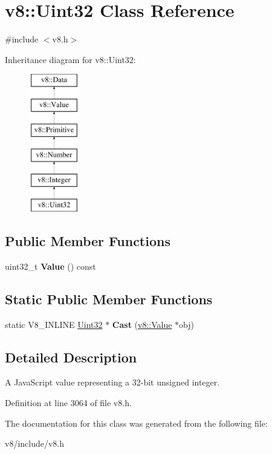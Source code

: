 \hypertarget{classv8_1_1Uint32}{}\section{v8\+:\+:Uint32 Class Reference}
\label{classv8_1_1Uint32}


{\ttfamily \#include $<$v8.\+h$>$}

Inheritance diagram for v8\+:\+:Uint32\+:\begin{figure}[H]
\begin{center}
\leavevmode
\includegraphics[height=6.000000cm]{classv8_1_1Uint32}
\end{center}
\end{figure}
\subsection*{Public Member Functions}
\begin{DoxyCompactItemize}
\item 
\mbox{\label{classv8_1_1Uint32_af0b7097435b29db75b8358eecb2bdb44}} 
uint32\+\_\+t {\bfseries Value} () const
\end{DoxyCompactItemize}
\subsection*{Static Public Member Functions}
\begin{DoxyCompactItemize}
\item 
\mbox{\label{classv8_1_1Uint32_a41a1785c19221868e338b93faa383b62}} 
static V8\+\_\+\+I\+N\+L\+I\+NE \mbox{\hyperlink{classv8_1_1Uint32}{Uint32}} $\ast$ {\bfseries Cast} (\mbox{\hyperlink{classv8_1_1Value}{v8\+::\+Value}} $\ast$obj)
\end{DoxyCompactItemize}


\subsection{Detailed Description}
A Java\+Script value representing a 32-\/bit unsigned integer. 

Definition at line 3064 of file v8.\+h.



The documentation for this class was generated from the following file\+:\begin{DoxyCompactItemize}
\item 
v8/include/v8.\+h\end{DoxyCompactItemize}
